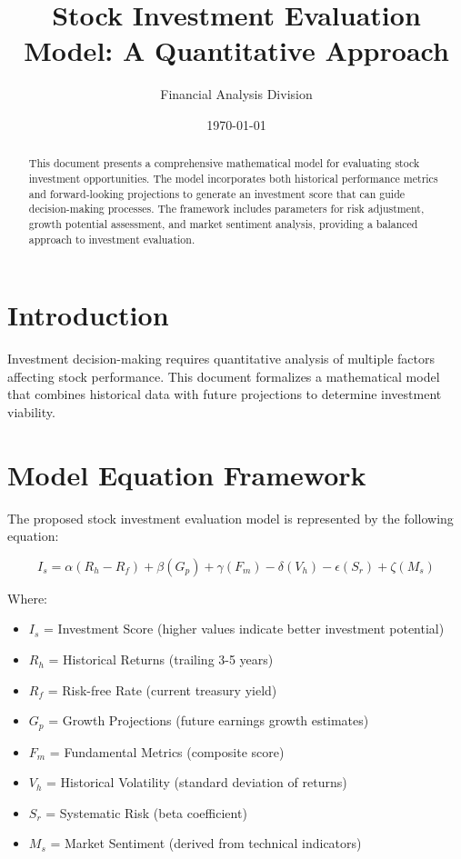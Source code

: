 \documentclass[12pt,a4paper]{article}
\title{Stock Investment Evaluation Model: A Quantitative Approach}
\author{Financial Analysis Division}
\date{\today}
\begin{document}
\maketitle

\begin{abstract}
This document presents a comprehensive mathematical model for evaluating stock investment opportunities. The model incorporates both historical performance metrics and forward-looking projections to generate an investment score that can guide decision-making processes. The framework includes parameters for risk adjustment, growth potential assessment, and market sentiment analysis, providing a balanced approach to investment evaluation.
\end{abstract}

\section{Introduction}
Investment decision-making requires quantitative analysis of multiple factors affecting stock performance. This document formalizes a mathematical model that combines historical data with future projections to determine investment viability.

\section{Model Equation Framework}
The proposed stock investment evaluation model is represented by the following equation:

\begin{equation}
I_s = \alpha(R_h - R_f) + \beta(G_p) + \gamma(F_m) - \delta(V_h) - \epsilon(S_r) + \zeta(M_s)
\end{equation}

Where:
\begin{itemize}
    \item $I_s$ = Investment Score (higher values indicate better investment potential)
    \item $R_h$ = Historical Returns (trailing 3-5 years)
    \item $R_f$ = Risk-free Rate (current treasury yield)
    \item $G_p$ = Growth Projections (future earnings growth estimates)
    \item $F_m$ = Fundamental Metrics (composite score)
    \item $V_h$ = Historical Volatility (standard deviation of returns)
    \item $S_r$ = Systematic Risk (beta coefficient)
    \item $M_s$ = Market Sentiment (derived from technical indicators)
\end{itemize}
\end{document}
